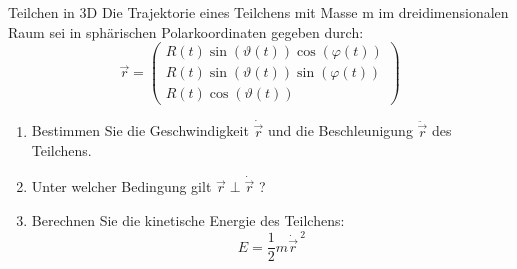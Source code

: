 \setcounter{punkte}{10}
\begin{aufgabe}{Teilchen in 3D}
Die Trajektorie eines Teilchens mit Masse m im dreidimensionalen Raum sei in sphärischen
Polarkoordinaten gegeben durch:
\begin{equation}
  \vec{r} =
  \begin{pmatrix}
      R(t) \sin\!\left(\vartheta(t)\right) \cos\!\left(\varphi(t)\right) \\
      R(t) \sin\!\left(\vartheta(t)\right) \sin\!\left(\varphi(t)\right) \\
      R(t) \cos\!\left(\vartheta(t)\right)
  \end{pmatrix}
  \label{eqn:trajektorie}
\end{equation}
\renewcommand{\labelenumi}{\alph{enumi})}
\renewcommand{\labelenumii}{(\roman{enumii})}
\begin{enumerate}
  \item Bestimmen Sie die Geschwindigkeit $\dot{\vec{r}}$ und die Beschleunigung
  $\ddot{\vec{r}}$ des Teilchens.
  \item Unter welcher Bedingung gilt $\vec{r} \perp \dot{\vec{r}}$ ?
  \item Berechnen Sie die kinetische Energie des Teilchens:
  \begin{equation}
    E = \frac{1}{2} m {\dot{\vec{r}}\,}^2
    \label{eqn:ekin}
  \end{equation}
\end{enumerate}
\end{aufgabe}

%
%
